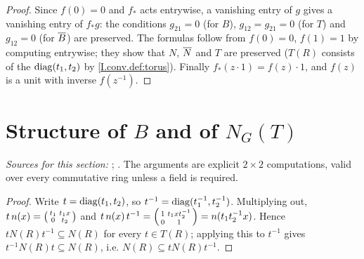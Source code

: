 \begin{lemma}
\end{lemma}
\begin{proof}
Since $f(0)=0$ and $f_*$ acts entrywise, a vanishing entry of $g$ gives a vanishing entry of $f_*g$: the conditions
$g_{21}=0$ (for $B$), $g_{12}=g_{21}=0$ (for $T$) and $g_{12}=0$ (for $\overline{B}$) are preserved. The formulas follow
from $f(0)=0$, $f(1)=1$ by computing entrywise; they show that $N$, $\overline{N}$ and $T$ are preserved
($T(R)$ consists of the $\operatorname{diag}(t_1,t_2)$ by \cref{I.conv.def:torus}). Finally
$f_*(z\cdot1)=f(z)\cdot1$, and $f(z)$ is a unit with inverse $f(z^{-1})$.
\end{proof}

\section{\texorpdfstring{Structure of $B$ and of $N_G(T)$}{Structure of B and of NG(T)}}\label{sec:conv-structure}

\noindent\emph{Sources for this section:} \cite[§2]{AIntro}; \cite[Lecture IV §1]{Gel}. The arguments are explicit
$2\times2$ computations, valid over every commutative ring unless a field is required.

\begin{lemma}[$T$ normalizes $N$]
\end{lemma}
\begin{proof}
Write $t=\operatorname{diag}(t_1,t_2)$, so $t^{-1}=\operatorname{diag}(t_1^{-1},t_2^{-1})$. Multiplying out,
$t\,n(x)=\begin{psmallmatrix}t_1&t_1x\\0&t_2\end{psmallmatrix}$ and
$t\,n(x)\,t^{-1}=\begin{psmallmatrix}1&t_1xt_2^{-1}\\0&1\end{psmallmatrix}=n(t_1t_2^{-1}x)$. Hence
$tN(R)t^{-1}\subseteq N(R)$ for every $t\in T(R)$; applying this to $t^{-1}$ gives $t^{-1}N(R)t\subseteq N(R)$, i.e.
$N(R)\subseteq tN(R)t^{-1}$.
\end{proof}

